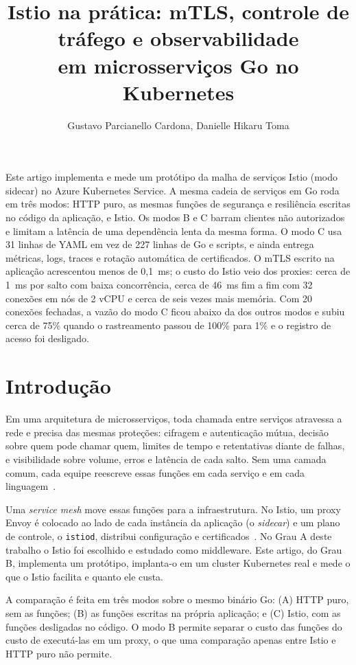 \documentclass[12pt]{article}
\title{Istio na prática: mTLS, controle de tráfego e observabilidade\\
em microsserviços Go no Kubernetes}
\author{Gustavo Parcianello Cardona\inst{1}, Danielle Hikaru Toma\inst{1}}
\begin{document}
\maketitle

\begin{resumo}
  Este artigo implementa e mede um protótipo da malha de serviços Istio
  (modo sidecar) no Azure Kubernetes Service. A mesma cadeia de serviços em Go
  roda em três modos: HTTP puro, as mesmas funções de segurança e resiliência
  escritas no código da aplicação, e Istio. Os modos B e C barram clientes não
  autorizados e limitam a latência de uma dependência lenta da mesma forma. O
  modo C usa 31 linhas de YAML em vez de 227 linhas de Go e scripts, e ainda
  entrega métricas, logs, traces e rotação automática de certificados. O mTLS
  escrito na aplicação acrescentou menos de 0,1~ms; o custo do Istio veio dos
  proxies: cerca de 1~ms por salto com baixa concorrência, cerca de 46~ms fim a
  fim com 32 conexões em nós de 2 vCPU e cerca de seis vezes mais memória. Com
  20 conexões fechadas, a vazão do modo C ficou abaixo da dos outros modos e
  subiu cerca de 75\% quando o rastreamento passou de 100\% para 1\% e o
  registro de acesso foi desligado.
\end{resumo}

\section{Introdução}

Em uma arquitetura de microsserviços, toda chamada entre serviços atravessa a
rede e precisa das mesmas proteções: cifragem e autenticação mútua, decisão
sobre quem pode chamar quem, limites de tempo e retentativas diante de falhas,
e visibilidade sobre volume, erros e latência de cada salto. Sem uma camada
comum, cada equipe reescreve essas funções em cada serviço e em cada
linguagem~\cite{redhat,flinders}.

Uma \emph{service mesh} move essas funções para a infraestrutura. No Istio, um
proxy Envoy é colocado ao lado de cada instância da aplicação (o
\emph{sidecar}) e um plano de controle, o \texttt{istiod}, distribui
configuração e certificados~\cite{istio-arch}. No Grau A deste trabalho o
Istio foi escolhido e estudado como middleware. Este artigo, do Grau B,
implementa um protótipo, implanta-o em um cluster Kubernetes real e mede o que
o Istio facilita e quanto ele custa.

A comparação é feita em três modos sobre o mesmo binário Go: (A) HTTP puro,
sem as funções; (B) as funções escritas na própria aplicação; e (C) Istio, com
as funções desligadas no código. O modo B permite separar o custo das funções
do custo de executá-las em um proxy, o que uma comparação apenas entre Istio e
HTTP puro não permite.
\end{document}
